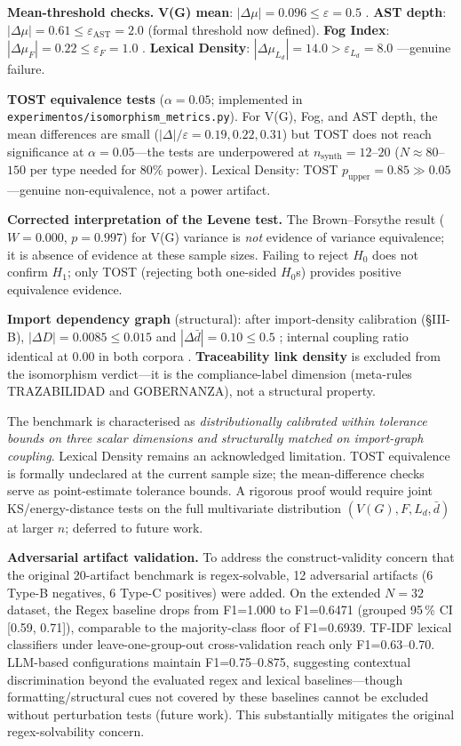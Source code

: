\documentclass{ieeeaccess}
\begin{document}
\textbf{Mean-threshold checks.} \textbf{V(G) mean}: $|\Delta\mu|=0.096\leq\varepsilon=0.5$ \checkmark. \textbf{AST depth}: $|\Delta\mu|=0.61\leq\varepsilon_\text{AST}=2.0$ \checkmark (formal threshold now defined). \textbf{Fog Index}: $|\Delta\mu_F|=0.22\leq\varepsilon_F=1.0$ \checkmark. \textbf{Lexical Density}: $|\Delta\mu_{L_d}|=14.0>\varepsilon_{L_d}=8.0$ \texttimes---genuine failure.

\textbf{TOST equivalence tests} ($\alpha=0.05$; implemented in \texttt{experimentos/isomorphism\_metrics.py}). For V(G), Fog, and AST depth, the mean differences are small ($|\Delta|/\varepsilon=0.19, 0.22, 0.31$) but TOST does not reach significance at $\alpha=0.05$---the tests are underpowered at $n_\text{synth}=12$--$20$ ($N\approx80$--$150$ per type needed for 80\% power). Lexical Density: TOST $p_\text{upper}=0.85\gg0.05$---genuine non-equivalence, not a power artifact.

\textbf{Corrected interpretation of the Levene test.} The Brown--Forsythe result ($W=0.000$, $p=0.997$) for V(G) variance is \emph{not} evidence of variance equivalence; it is absence of evidence at these sample sizes. Failing to reject $H_0$ does not confirm $H_1$; only TOST (rejecting both one-sided $H_0$s) provides positive equivalence evidence.

\textbf{Import dependency graph} (structural): after import-density calibration (§III-B), $|\Delta D|=0.0085\leq0.015$ \checkmark and $|\Delta\bar{d}|=0.10\leq0.5$ \checkmark; internal coupling ratio identical at 0.00 in both corpora \checkmark. \textbf{Traceability link density} is excluded from the isomorphism verdict---it is the compliance-label dimension (meta-rules TRAZABILIDAD and GOBERNANZA), not a structural property.

The benchmark is characterised as \emph{distributionally calibrated within tolerance bounds on three scalar dimensions and structurally matched on import-graph coupling}. Lexical Density remains an acknowledged limitation. TOST equivalence is formally undeclared at the current sample size; the mean-difference checks serve as point-estimate tolerance bounds. A rigorous proof would require joint KS/energy-distance tests on the full multivariate distribution $(V(G), F, L_d, \bar{d})$ at larger $n$; deferred to future work.

\textbf{Adversarial artifact validation.} To address the construct-validity concern that the original 20-artifact benchmark is regex-solvable, 12 adversarial artifacts (6 Type-B negatives, 6 Type-C positives) were added. On the extended $N=32$ dataset, the Regex baseline drops from F1=1.000 to F1=0.6471 (grouped 95\,\% CI [0.59, 0.71]), comparable to the majority-class floor of F1=0.6939. TF-IDF lexical classifiers under leave-one-group-out cross-validation reach only F1=0.63--0.70. LLM-based configurations maintain F1=0.75--0.875, suggesting contextual discrimination beyond the evaluated regex and lexical baselines---though formatting/structural cues not covered by these baselines cannot be excluded without perturbation tests (future work). This substantially mitigates the original regex-solvability concern.
\end{document}
